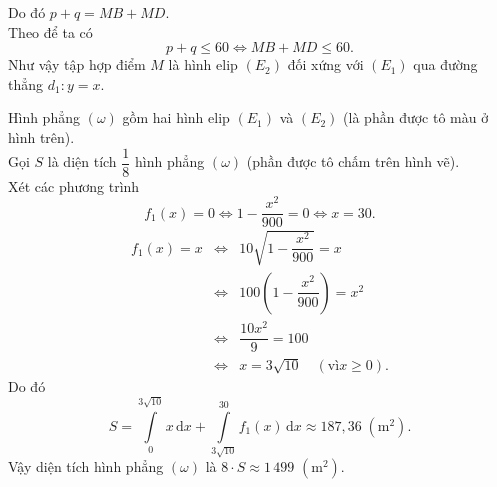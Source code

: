 \begin{ex}
{\begin{itemize}
			Do đó $p+q=MB+MD$. \\
			Theo để ta có 
			\[p+q \le 60 \Leftrightarrow MB+MD \le 60.\]
			Như vậy tập hợp điểm $M$ là hình elip $(E_2)$ đối xứng với $(E_1)$ qua đường thẳng $d_1 \colon y=x$. 
		\end{itemize}
		Hình phẳng $(\omega)$ gồm hai hình elip $(E_1)$ và $(E_2)$ (là phần được tô màu ở hình trên). \\
		Gọi $S$ là diện tích $\dfrac{1}{8}$ hình phẳng $(\omega)$ (phần được tô chấm trên hình vẽ). \\
		Xét các phương trình 
		\[f_1(x)=0 \Leftrightarrow 1-\dfrac{x^2}{900}=0 \Leftrightarrow x=30.\]
		\begin{eqnarray*}
			f_1(x)=x &\Leftrightarrow& 10\sqrt{1-\dfrac{x^2}{900}}=x \\
			&\Leftrightarrow& 100\left(1-\dfrac{x^2}{900}\right)=x^2 \\
			&\Leftrightarrow& \dfrac{10x^2}{9}=100 \\ 
			&\Leftrightarrow& x=3\sqrt{10} \quad (\text{vì} x \ge 0).
		\end{eqnarray*}
		Do đó 
		\[S=\displaystyle\int\limits_{0}^{3\sqrt{10}} x \, \mathrm{d}x+\displaystyle\int\limits_{3\sqrt{10}}^{30} f_1(x) \, \mathrm{d}x \approx 187{,}36 \; \left(\text{m}^2\right).\]
		Vậy diện tích hình phẳng $(\omega)$ là $8 \cdot S \approx 1\,499$ $\left(\text{m}^2\right)$.
	}
\end{ex}
